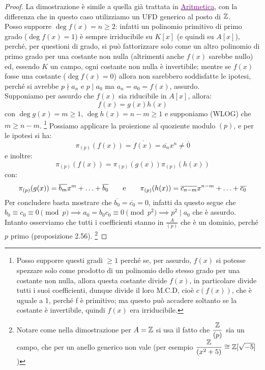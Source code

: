 \documentclass[11pt]{scrartcl}
\begin{document}
\begin{proof}
    La dimostrazione è simile a quella già trattata in \href{https://github.com/diego-unipi/Appunti-Aritmetica}{\textcolor{purple}{Aritmetica}}, 
    con la differenza che in questo caso utilizziamo un UFD generico al posto di $\mathbb Z$. \\
    Posso supporre $\deg f(x) = n \geq 2$: infatti un polinomio primitivo di primo grado ($\deg f(x) = 1$) è sempre irriducibile su $K[x]$ (e quindi su $A[x]$), 
    perché, per questioni di grado, si può fattorizzare solo come un altro polinomio di primo grado per una costante non nulla (altrimenti anche $f(x)$ sarebbe nullo) ed, essendo $K$ un campo, ogni costante non nulla è invertibile;
    mentre se $f(x)$ fosse una costante ($\deg f(x) = 0$) allora non sarebbero soddisfatte le ipotesi, 
    perché si avrebbe $p \nmid a_n$ e $p \mid a_0$ ma $a_n = a_0 = f(x)$, assurdo. \\
    Supponiamo per assurdo che $f(x)$ sia riducibile in $A[x]$, allora:
        \[ f(x) = g(x)h(x)
	    \]
    con $\deg g(x) = m \geq 1$, $\deg h(x) = n-m \geq 1$ e supponiamo (WLOG) che $m \geq n-m$. 
    \footnote{Posso supporre questi gradi $\geq 1$ perché se, per assurdo, $f(x)$ si potesse spezzare solo come prodotto di un polinomio dello stesso grado per una costante non nulla, allora questa costante divide $f(x)$, in particolare divide tutti i suoi coefficienti, dunque divide il loro M.C.D, cioè $c(f(x))$, che è uguale a 1, perché f è primitivo; ma questo può accadere soltanto se la costante è invertibile, quindi $f(x)$ era irriducibile.}
    Possiamo applicare la proiezione al quoziente modulo $(p)$, e per le ipotesi si ha:
        \[  \pi_{(p)}(f(x)) = \overline{f(x)} = \overline{a_n}x^n \ne \overline 0
	    \] 
    e inoltre:
	\[ \pi_{(p)}(f(x)) =  \pi_{(p)}(g(x)) \pi_{(p)}(h(x))
	    \]
    con:
	\[ \pi_{(p)}(g(x)) = \overline{b_m}x^m + \ldots + \overline{b_0} 
	   \qquad \text e \qquad 
	   \pi_{(p)}(h(x)) = \overline{c_{n-m}}x^{n-m} + \ldots + \overline{c_0}
	    \]
    Per concludere basta mostrare che $\overline{b_0} = \overline{c_0} = 0$, 
    infatti da questo segue che $b_0 \equiv c_0 \equiv 0 \pmod p \implies a_0 = b_0c_0 \equiv 0 \pmod{p^2} \implies p^2 \mid a_0$ che è assurdo.
    Intanto osserviamo che tutti i coefficienti stanno in $\displaystyle \frac{A}{(p)}$ che è un dominio, perché $p$ primo (proposizione 2.56).
    \footnote{Notare come nella dimostrazione per $A = \mathbb Z$ si usa il fatto che $\displaystyle \frac{\mathbb Z}{(p)}$ sia un campo, che per un anello generico non vale (per esempio $\displaystyle \frac{\mathbb Z}{(x^2+5)} \cong \mathbb Z[\sqrt{-5}]$)}

\end{proof}
\end{document}

